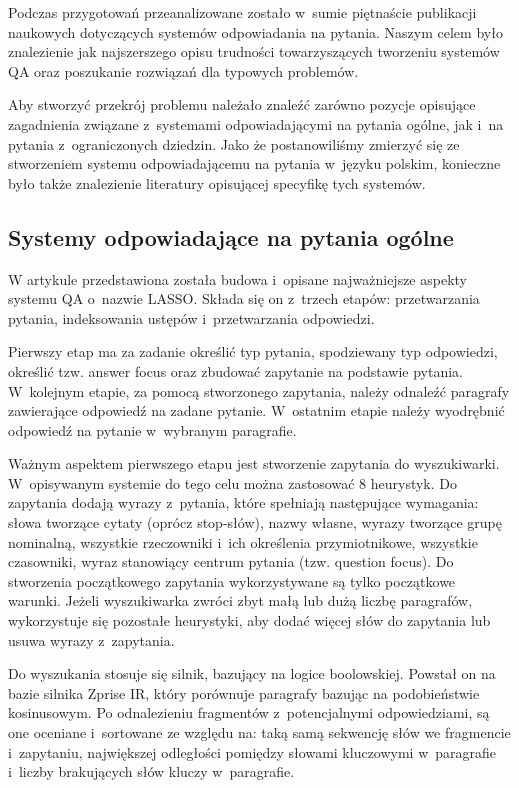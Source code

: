 Podczas przygotowań przeanalizowane zostało w~sumie piętnaście publikacji naukowych dotyczących systemów odpowiadania na pytania. Naszym celem było znalezienie jak najszerszego opisu trudności towarzyszących tworzeniu systemów QA oraz poszukanie rozwiązań dla typowych problemów. 

Aby stworzyć przekrój problemu należało znaleźć zarówno pozycje opisujące zagadnienia związane z~systemami odpowiadającymi na pytania ogólne, jak i~na pytania z~ograniczonych dziedzin. Jako że postanowiliśmy zmierzyć się ze stworzeniem systemu odpowiadającemu na pytania w~języku polskim, konieczne było także znalezienie literatury opisującej specyfikę tych systemów.

\subsection{Systemy odpowiadające na pytania ogólne}\label{subsec:lit:op}

W artykule \cite{moldovan-etal-2000-structure} przedstawiona została budowa i~opisane najważniejsze aspekty systemu QA o~nazwie LASSO. Składa się on z~trzech etapów: przetwarzania pytania, indeksowania ustępów i~przetwarzania odpowiedzi. 

Pierwszy etap ma za zadanie określić typ pytania, spodziewany typ odpowiedzi, określić tzw. answer focus oraz zbudować zapytanie na podstawie pytania. W~kolejnym etapie, za pomocą stworzonego zapytania,  należy odnaleźć paragrafy zawierające odpowiedź na zadane pytanie. W~ostatnim etapie należy wyodrębnić odpowiedź na pytanie w~wybranym paragrafie.

Ważnym aspektem pierwszego etapu jest stworzenie zapytania do wyszukiwarki. W~opisywanym systemie do tego celu można zastosować 8 heurystyk. Do zapytania dodają wyrazy z~pytania, które spełniają następujące wymagania: słowa tworzące cytaty (oprócz stop-słów), nazwy własne, wyrazy tworzące grupę nominalną, wszystkie rzeczowniki i~ich określenia przymiotnikowe, wszystkie czasowniki, wyraz stanowiący centrum pytania (tzw. question focus). Do stworzenia początkowego zapytania wykorzystywane są tylko początkowe warunki. Jeżeli wyszukiwarka zwróci zbyt małą lub dużą liczbę paragrafów, wykorzystuje się pozostałe heurystyki, aby dodać więcej słów do zapytania lub usuwa wyrazy z~zapytania. 

Do wyszukania stosuje się silnik, bazujący na logice boolowskiej.  Powstał on na bazie silnika Zprise IR, który porównuje paragrafy bazując na podobieństwie kosinusowym. Po odnalezieniu fragmentów z~potencjalnymi odpowiedziami, są one oceniane i~sortowane ze względu na: taką samą sekwencję słów we fragmencie i~zapytaniu, największej odległości pomiędzy słowami kluczowymi w~paragrafie i~liczby brakujących słów kluczy w~paragrafie. 

